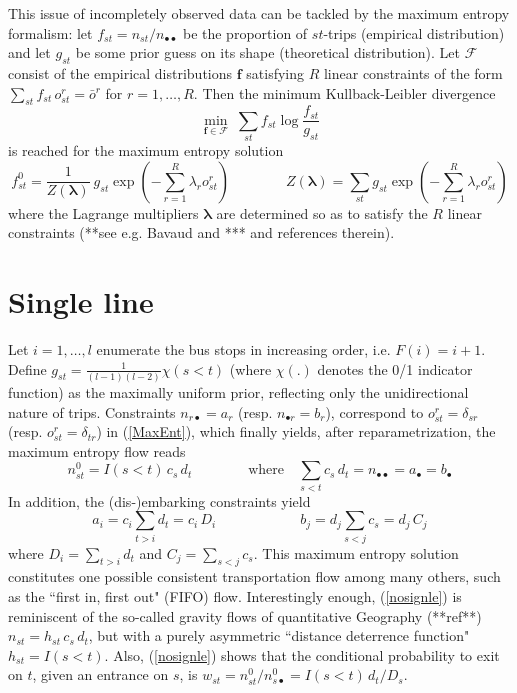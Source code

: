 \documentclass{llncs}
\begin{document}
This issue of incompletely observed data can be tackled by the maximum entropy formalism: let $f_{st}=n_{st}/n_{\bullet\bullet}$ be the proportion of $st$-trips (empirical distribution) and let $g_{st}$ be some prior guess on its shape (theoretical distribution). Let $\mathcal{F}$ consist of the empirical distributions $\mathbf{f}$ satisfying $R$ linear constraints of the form $\sum_{st}f_{st}\, o^r_{st}=\bar{o}^r$ for $r=1,\ldots, R$. Then the minimum Kullback-Leibler divergence 
\begin{displaymath}
\min_{\mathbf{f}\in\mathcal{F}}\;  \sum_{st}f_{st}\log \frac{f_{st}}{g_{st}}
\end{displaymath}
is reached for the maximum entropy solution  
\begin{equation}
\label{MaxEnt}
f^0_{st}=\frac{1}{Z(\bm{\lambda})}\: g_{st}\exp(-\sum_{r=1}^R \lambda_r o^r_{st})\qquad\qquad Z(\bm{\lambda})=\sum_{st}g_{st}\exp(-\sum_{r=1}^R \lambda_r o^r_{st})
\end{equation}
where the Lagrange multipliers $\bm{\lambda}$ are determined  so as to satisfy the $R$ linear constraints (**see e.g. Bavaud and *** and references therein). 


\section{Single line}
\label{Single line}
Let  $i=1,\ldots, l$ enumerate the bus stops in increasing order,  i.e. $F(i)=i+1$. Define $g_{st}=\frac{1}{(l-1)(l-2)}\chi(s<t)$ (where $\chi(.)$ denotes the 0/1  indicator function) as the maximally uniform prior, reflecting only the unidirectional nature of trips. 
Constraints $n_{r\bullet}=a_r$ (resp. $n_{\bullet r}=b_r$), correspond to $o^r_{st}=
\delta_{sr}$ (resp. $o^r_{st}=\delta_{tr}$) in (\ref{MaxEnt}), which finally yields, after reparametrization, the maximum entropy flow reads
\begin{equation}
\label{nosignle}
n^0_{st}=I(s<t)\, c_s\, d_t \qquad\qquad\mbox{where}\quad \sum_{s<t}c_s\, d_t=n_{\bullet\bullet}=a_{\bullet}=b_\bullet
\end{equation}
In addition, the (dis-)embarking constraints  yield
\begin{equation}
\label{(dis embarking constraints}
a_i=c_i \sum_{t>i}d_t=c_i\, D_i 
\qquad\qquad\qquad
b_j=d_j\sum_{s<j}c_s=d_j \, C_j  
\end{equation}
where $D_i=\sum_{t>i}d_t$ and $C_j=\sum_{s<j}c_s$. This maximum entropy solution constitutes one possible consistent transportation flow among many others, such as the ``first in, first out" (FIFO) flow. Interestingly enough, (\ref{nosignle}) is reminiscent of the so-called gravity flows of quantitative Geography (**ref**) $n_{st}=h_{st}\, c_s\, d_t $, but with a purely asymmetric ``distance deterrence function" $h_{st}=I(s<t)$.  Also, 
(\ref{nosignle}) shows that  the conditional probability to exit on $t$, given an entrance on $s$, is $w_{st}=n^0_{st}/n^0_{s\bullet}=I(s<t)\, d_t/D_s$. 
\end{document}
